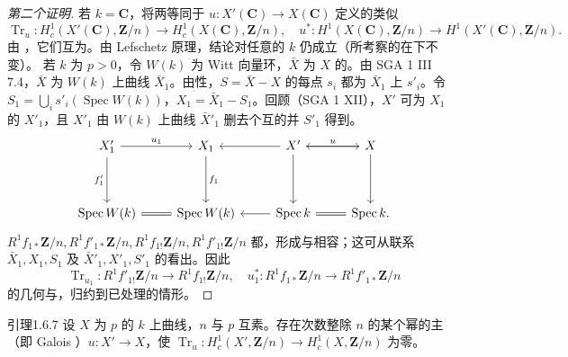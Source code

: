 \begin{proof}[第二个证明]
若 $k=\mathbf C$，将两等同于 $u:X'(\mathbf C)\to X(\mathbf C)$ 定义的类似
\[\operatorname{Tr}_u:H_c^1(X'(\mathbf C),\mathbf Z/n)\to H_c^1(X(\mathbf C),\mathbf Z/n),\quad
u^*:H^1(X(\mathbf C),\mathbf Z/n)\to H^1(X'(\mathbf C),\mathbf Z/n).\]
由 ，它们互为。由 Lefschetz 原理，结论对任意的 $k$ 仍成立（所考察的在下不变）。
若 $k$ 为 $p>0$，令 $W(k)$ 为 Witt 向量环，$\bar X$ 为 $X$ 的。由 SGA 1 III 7.4，$\bar X$ 为 $W(k)$ 上曲线 $\bar X_1$。由性，$S=\bar X-X$ 的每点 $s_i$ 都为 $\bar X_1$ 上 $s'_i$。令 $S_1=\bigcup_i s'_i(\operatorname{Spec}W(k))$，$X_1=\bar X_1-S_1$。回顾（SGA 1 XII），$X'$ 可为 $X_1$ 的 $X'_1$，且 $X'_1$ 由 $W(k)$ 上曲线 $\bar X'_1$ 删去个互的并 $S'_1$ 得到。
\[\begin{tikzcd}X'_1\arrow[r,"u_1"]\arrow[dd,"f'_1"']&X_1\arrow[dd,"f_1"]&X'\arrow[l]\arrow[r,"u"]\arrow[dd]&X\arrow[l]\arrow[dd]\\\\\operatorname{Spec}W(k)\arrow[r,equal]&\operatorname{Spec}W(k)&\operatorname{Spec}k\arrow[l]\arrow[r,equal]&\operatorname{Spec}k.\end{tikzcd}\]
 $R^1f_{1*}\mathbf Z/n,R^1f'_{1*}\mathbf Z/n,R^1f_{1!}\mathbf Z/n,R^1f'_{1!}\mathbf Z/n$ 都，形成与相容；这可从联系 $\bar X_1,X_1,S_1$ 及 $\bar X'_1,X'_1,S'_1$ 的看出。因此
\[\operatorname{Tr}_{u_1}:R^1f'_{1!}\mathbf Z/n\to R^1f_{1!}\mathbf Z/n,\quad
u_1^*:R^1f_{1*}\mathbf Z/n\to R^1f'_{1*}\mathbf Z/n\]
的几何与，归约到已处理的情形。
\end{proof}
\begin{SGAresult}{引理}{1.6.7}
设 $X$ 为 $p$ 的 $k$ 上曲线，$n$ 与 $p$ 互素。存在次数整除 $n$ 的某个幂的主（即 Galois ）$u:X'\to X$，使 $\operatorname{Tr}_u:H_c^1(X',\mathbf Z/n)\to H_c^1(X,\mathbf Z/n)$ 为零。
\end{SGAresult}
